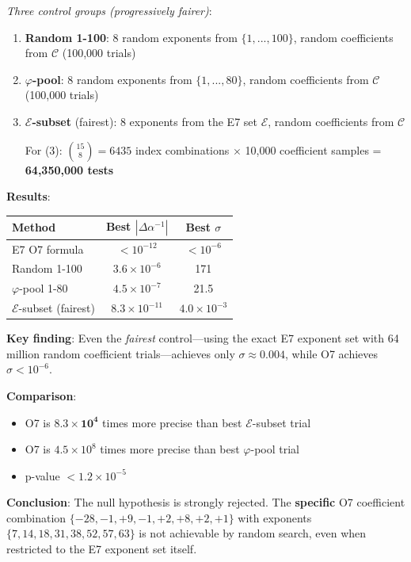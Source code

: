 \documentclass[11pt,a4paper]{article}
\begin{document}
\textit{Three control groups (progressively fairer)}:
\begin{enumerate}
\item \textbf{Random 1-100}: 8 random exponents from $\{1,...,100\}$, random coefficients from $\mathcal{C}$ (100,000 trials)
\item \textbf{$\varphi$-pool}: 8 random exponents from $\{1,...,80\}$, random coefficients from $\mathcal{C}$ (100,000 trials)
\item \textbf{$\mathcal{E}$-subset} (fairest): 8 exponents from the E7 set $\mathcal{E}$, random coefficients from $\mathcal{C}$

For (3): $\binom{15}{8} = 6435$ index combinations $\times$ 10,000 coefficient samples = \textbf{64,350,000 tests}
\end{enumerate}

\textbf{Results}:
\begin{center}
\begin{tabular}{|l|c|c|}
\hline
\textbf{Method} & \textbf{Best $|\Delta\alpha^{-1}|$} & \textbf{Best $\sigma$} \\
\hline
E7 O7 formula & $< 10^{-12}$ & $< 10^{-6}$ \\
Random 1-100 & $3.6 \times 10^{-6}$ & 171 \\
$\varphi$-pool 1-80 & $4.5 \times 10^{-7}$ & 21.5 \\
$\mathcal{E}$-subset (fairest) & $8.3 \times 10^{-11}$ & $4.0 \times 10^{-3}$ \\
\hline
\end{tabular}
\end{center}

\textbf{Key finding}: Even the \textit{fairest} control---using the exact E7 exponent set with 64 million random coefficient trials---achieves only $\sigma \approx 0.004$, while O7 achieves $\sigma < 10^{-6}$.

\textbf{Comparison}:
\begin{itemize}
\item O7 is $\mathbf{8.3 \times 10^4}$ times more precise than best $\mathcal{E}$-subset trial
\item O7 is $4.5 \times 10^8$ times more precise than best $\varphi$-pool trial
\item p-value $< 1.2 \times 10^{-5}$
\end{itemize}

\textbf{Conclusion}: The null hypothesis is strongly rejected. The \textbf{specific} O7 coefficient combination $\{-28, -1, +9, -1, +2, +8, +2, +1\}$ with exponents $\{7, 14, 18, 31, 38, 52, 57, 63\}$ is not achievable by random search, even when restricted to the E7 exponent set itself.
\end{document}
